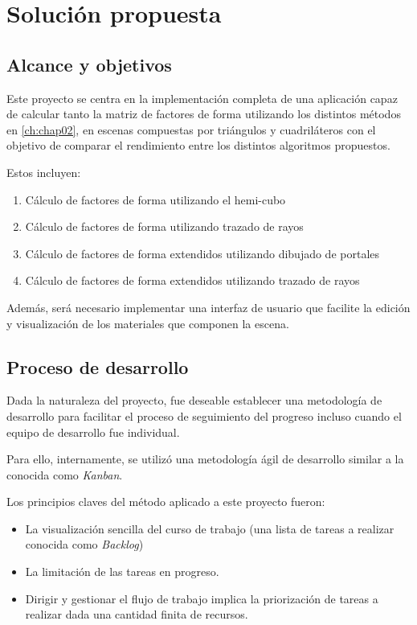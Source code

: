 \chapter{Solución propuesta}
\label{ch:chap03}

\section{Alcance y objetivos}
\label{sec:alcance}

Este proyecto se centra en la implementación completa de una aplicación capaz de calcular tanto la matriz de factores de forma utilizando los distintos métodos en \ref{ch:chap02}, en escenas compuestas por triángulos y cuadriláteros con el objetivo de comparar el rendimiento entre los distintos algoritmos propuestos. 

Estos incluyen:

\begin{enumerate}
 	\item Cálculo de factores de forma utilizando el hemi-cubo
 	\item  Cálculo de factores de forma utilizando trazado de rayos
 	\item Cálculo de factores de forma extendidos utilizando dibujado de portales
 	\item Cálculo de factores  de forma extendidos utilizando trazado de rayos
\end{enumerate}

Además, será necesario implementar una interfaz de usuario que facilite la edición y visualización de los materiales que componen la escena.

\section{Proceso de desarrollo}
\label{sec:procdes}

Dada la naturaleza del proyecto, fue deseable establecer una metodología de desarrollo para facilitar el proceso de seguimiento del progreso incluso cuando el equipo de desarrollo fue individual.

Para ello, internamente, se utilizó una metodología ágil de desarrollo similar a la conocida como \textit{Kanban}.

Los principios claves del método aplicado a este proyecto fueron:
\begin{itemize}
	\item La visualización sencilla del curso de trabajo (una lista de tareas a realizar conocida como \textit{Backlog})
	\item La limitación de las tareas en progreso.
	\item Dirigir y gestionar el flujo de trabajo implica la priorización de tareas a realizar dada una cantidad finita de recursos.
\end{itemize}

